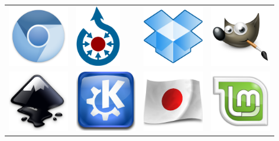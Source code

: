 \noindent
\begin{tabular}{llll}
\includegraphics[height=100px]{img/thanks/chromium.png}
& \includegraphics[height=100px]{img/thanks/commons.png}
& \includegraphics[height=100px]{img/thanks/dropbox.png}
& \includegraphics[height=100px]{img/thanks/gimp.png}\\

\includegraphics[height=100px]{img/thanks/inkscape.png}
& \includegraphics[height=100px]{img/thanks/kde.png}
& \includegraphics[height=100px]{img/thanks/kiten.png}
& \includegraphics[height=100px]{img/thanks/linuxmint.png}\\


\end{tabular}
